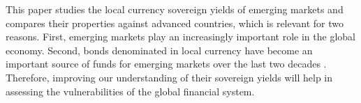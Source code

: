 This paper studies the local currency sovereign yields of emerging markets and compares their properties against advanced countries, which is relevant for two reasons.
First, emerging markets play an increasingly important role in the global economy.
Second, bonds denominated in local currency have become an important source of funds for emerging markets over the last two decades \citep{DuSchreger:2016WP,OttonelloPerez:2019,Galli:2020}.
Therefore, improving our understanding of their sovereign yields will help in assessing the vulnerabilities of the global financial system.

